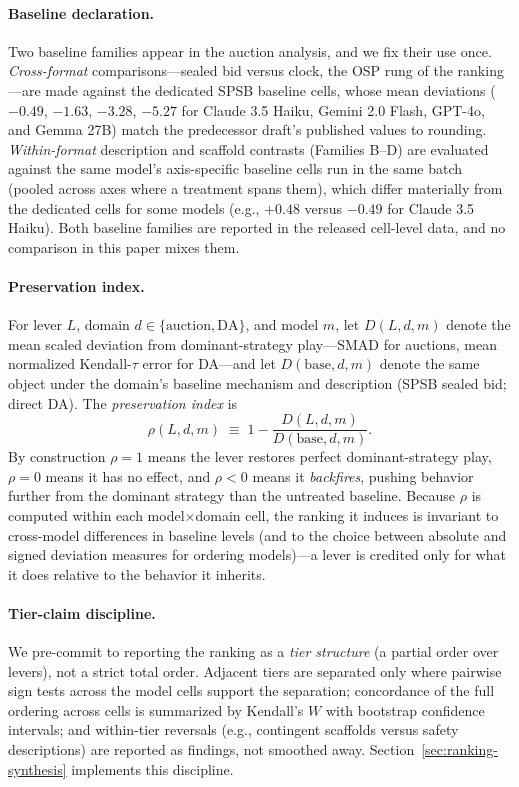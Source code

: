 \paragraph{Baseline declaration.}
Two baseline families appear in the auction analysis, and we fix their use
once. \emph{Cross-format} comparisons---sealed bid versus clock, the OSP rung
of the ranking---are made against the dedicated SPSB baseline cells, whose
mean deviations ($-0.49$, $-1.63$, $-3.28$, $-5.27$ for Claude 3.5 Haiku,
Gemini 2.0 Flash, GPT-4o, and Gemma 27B) match the predecessor draft's
published values to rounding. \emph{Within-format} description and scaffold
contrasts (Families B--D) are evaluated against the same model's axis-specific
baseline cells run in the same batch (pooled across axes where a treatment
spans them), which differ materially from the dedicated cells for some models
(e.g., $+0.48$ versus $-0.49$ for Claude 3.5 Haiku). Both baseline families
are reported in the released cell-level data, and no comparison in this paper
mixes them.

\paragraph{Preservation index.}
For lever $L$, domain $d\in\{\text{auction},\text{DA}\}$, and model $m$, let
$D(L,d,m)$ denote the mean scaled deviation from dominant-strategy play---SMAD
for auctions, mean normalized Kendall-$\tau$ error for DA---and let
$D(\text{base},d,m)$ denote the same object under the domain's baseline
mechanism and description (SPSB sealed bid; direct DA). The
\emph{preservation index} is
\[
\rho(L,d,m) \;\equiv\; 1 - \frac{D(L,d,m)}{D(\text{base},d,m)}.
\]
By construction $\rho=1$ means the lever restores perfect dominant-strategy
play, $\rho=0$ means it has no effect, and $\rho<0$ means it \emph{backfires},
pushing behavior further from the dominant strategy than the untreated
baseline. Because $\rho$ is computed within each model$\times$domain cell, the
ranking it induces is invariant to cross-model differences in baseline levels
(and to the choice between absolute and signed deviation measures for ordering
models)---a lever is credited only for what it does relative to the behavior
it inherits.

\paragraph{Tier-claim discipline.}
We pre-commit to reporting the ranking as a \emph{tier structure} (a partial
order over levers), not a strict total order. Adjacent tiers are separated
only where pairwise sign tests across the model cells support
the separation; concordance of the full ordering across cells is summarized by
Kendall's $W$ with bootstrap confidence intervals; and within-tier reversals
(e.g., contingent scaffolds versus safety descriptions) are
reported as findings, not smoothed away. Section~\ref{sec:ranking-synthesis}
implements this discipline.

